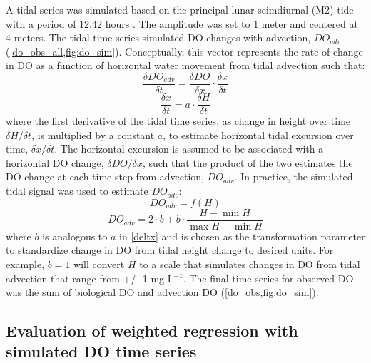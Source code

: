 \documentclass[letterpaper,12pt,oneside]{article}\usepackage[]{graphicx}\usepackage[]{color}
\begin{document}
A tidal series was simulated based on the principal lunar seimdiurnal (M2) tide with a period of 12.42 hours \citep{Foreman89}.  The amplitude was set to 1 meter and centered  at 4 meters.  The tidal time series simulated \ac{DO} changes with advection, $DO_{adv}$ (\cref{do_obs_all,fig:do_sim}). Conceptually, this vector represents the rate of change in \ac{DO} as a function of horizontal water movement from tidal advection such that:
\begin{equation} \label{deltdo}
\frac{\delta DO_{adv}}{\delta t} = \frac{\delta DO}{\delta x} \cdot \frac{\delta x}{\delta t}
\end{equation}
\begin{equation} \label{deltx}
\frac{\delta x}{\delta t} = a \cdot \frac{\delta H}{\delta t}
\end{equation}
where the first derivative of the tidal time series, as change in height over time $\delta H / \delta t$, is multiplied by a constant $a$, to estimate horizontal tidal excursion over time, $\delta x / \delta t$.  The horizontal excursion is assumed to be associated with a horizontal \ac{DO} change, $\delta DO / \delta x$, such that the product of the two estimates the \ac{DO} change at each time step from advection, $DO_{adv}$. In practice, the simulated tidal signal was used to estimate $DO_{adv}$:
\begin{equation} \label{do_advp}
DO_{adv} = f\left(H\right)
\end{equation}
\begin{equation} \label{do_adv}
DO_{adv} = 2\cdot b + b \cdot \frac{H- \min H}{\max H - \min H}
\end{equation}
where $b$ is analogous to $a$ in \cref{deltx} and is chosen as the transformation parameter to standardize change in \ac{DO} from tidal height change to desired units.  For example, $b = 1$ will convert $H$ to a scale that simulates changes in \ac{DO} from tidal advection that range from +/- 1 mg L$^{-1}$.  The final time series for observed \ac{DO} was the sum of biological \ac{DO} and advection \ac{DO} (\cref{do_obs,fig:do_sim}).

\subsection{Evaluation of weighted regression with simulated \ac{DO} time series}
\end{document}

